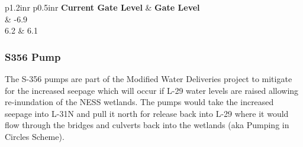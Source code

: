 \footnotesize
\begin{table}[!h]
\centering
\caption{Control strategy for S334 close (units are ft. NGVD29)}
\label{tab:CS-S334close}
\begin{tabular}{p{1.2in}{r} p{0.5in}{r}}
\hline
\textbf{Current Gate Level} & \textbf{Gate Level}\\
	& -6.9       \\
6.2	& 6.1   \\
\hline
\end{tabular}
\end{table}
\normalsize

%
%
%

\clearpage
\subsubsection{S356 Pump}
The S-356 pumps are part of the Modified Water Deliveries project to mitigate for the increased seepage which will occur if L-29 water levels are raised allowing re-inundation of the NESS wetlands.
The pumps would take the increased seepage into L-31N and pull it north for release back into L-29 where it would flow through the bridges and culverts back into the wetlands (aka Pumping in Circles Scheme).

